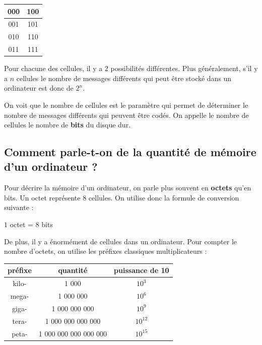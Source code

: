 \documentclass[10pt,a4paper]{book}
\begin{document}
\begin{center}
    \begin{tabular}{|c|c|}
         \hline
         000 & 100  \\
         \hline
         001 & 101 \\
         \hline
         010 & 110 \\
         \hline
         011 & 111\\
         \hline
    \end{tabular}
\end{center}

Pour chacune des cellules, il y a 2 possibilités différentes. Plus généralement, s'il y a $n$ cellules le nombre de messages différents qui peut être stocké dans un ordinateur est donc de $2^{n}$.

On voit que le nombre de cellules est le paramètre qui permet de déterminer le nombre de messages différents qui peuvent être codés. On appelle le nombre de cellules le nombre de \textbf{bits} du disque dur.



\subsection{Comment parle-t-on de la quantité de mémoire d'un ordinateur ?}


\begin{de}
Pour décrire la mémoire d'un ordinateur, on parle plus souvent en \textbf{octets} qu'en bits. Un octet représente 8 cellules. On utilise donc la formule de conversion suivante :
\begin{center}
    $1$ octet = $8$ bits
\end{center}
\end{de}

De plus, il y a énormément de cellules dans un ordinateur. Pour compter le nombre d'octets, on utilise les préfixes classiques multiplicateurs :

\begin{center}
    \begin{tabular}{|c|c|c|}
         \hline
         préfixe &  quantité &  puissance de 10 \\
         \hline
         kilo- & 1 000 & $10^3$ \\
         \hline
         mega- & 1 000 000 & $10^6$ \\
         \hline
         giga- & 1 000 000 000 & $10^9$ \\
         \hline
         tera- & 1 000 000 000 000 & $10^{12}$ \\
         \hline
         peta- & 1 000 000 000 000 000 & $10^{15}$ \\
         \hline
    \end{tabular}
\end{center}
\end{document}

